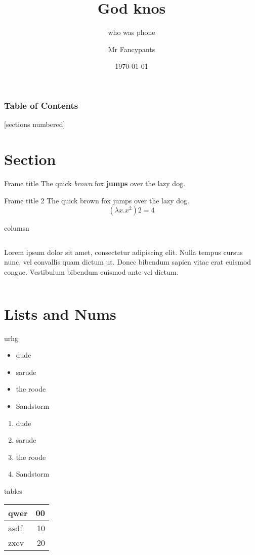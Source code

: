 \documentclass[10pt]{beamer}
\title{God knos}
\subtitle{who was phone}
\date{\today}
\author{Mr Fancypants}
\institute{NHK University of Gjallahorn}
\begin{document}
\maketitle

\begin{frame}
  \frametitle{Table of Contents}
  [sections numbered]
  \tableofcontents[hideallsubsections]
\end{frame}

\section{Section}
\begin{frame}{Frame title}
The quick \emph{brown} \alert{fox} \textbf{jumps} over the lazy dog.
\end{frame}

\begin{frame}{Frame title 2}
The quick brown fox jumps over the lazy dog.
\[
    (\lambda x.x^2) 2 = 4
\]
\end{frame}

\begin{frame}{columsn}
\begin{columns}
        Lorem ipsum dolor sit amet, consectetur \alert{adipiscing} elit. Nulla tempus cursus nunc, vel convallis quam dictum ut.
        Donec bibendum sapien vitae erat euismod congue. Vestibulum bibendum euismod ante vel dictum.
\end{columns}
\end{frame}


\section{Lists and Nums}
\begin{frame}{urhg}
\begin{itemize}
\item dude
\item sarude
\item the roode
\item Sandstorm
\end{itemize}
\begin{enumerate}
\item dude
\item sarude
\item the roode
\item Sandstorm
\end{enumerate}
\end{frame}


\begin{frame}{tables}
\begin{table}
\begin{tabular}{lr}
\toprule
qwer & 00 \\
\midrule
asdf & 10 \\
zxcv & 20 \\
\bottomrule
\end{tabular}
\end{table}
\end{frame}
\end{document}
